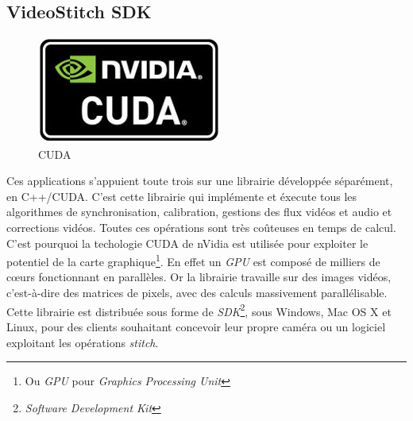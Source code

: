\subsection{VideoStitch SDK}
\label{videostitch-sdk-section}
\begin{figure}
  \centering
  \includegraphics[width=6cm]{images/cuda-logo.jpg}
  \caption{CUDA}
\end{figure}
Ces applications s'appuient toute trois sur une librairie développée séparément,
en C++/CUDA. C'est cette librairie qui implémente et éxecute tous les algorithmes
de synchronisation, calibration, gestions des flux vidéos et audio et corrections
vidéos.
Toutes ces opérations sont très coûteuses en temps de calcul. C'est pourquoi
la techologie CUDA de nVidia est utilisée pour exploiter le potentiel de la carte
graphique\footnote{Ou \textit{GPU} pour \textit{Graphics Processing Unit}}. 
En effet un \textit{GPU} est composé de milliers de c\oe urs fonctionnant en parallèles.
Or la librairie travaille sur des images vidéos, c'est-à-dire des matrices de pixels,
avec des calculs massivement parallélisable\cite{videostitch-cuda}.\\
\newline
Cette librairie est distribuée sous forme de \textit{SDK}\footnote{\textit{Software Development Kit}}, sous Windows, Mac OS X et Linux, 
pour des clients souhaitant concevoir leur propre caméra ou un logiciel exploitant
les opérations \textit{stitch}.

